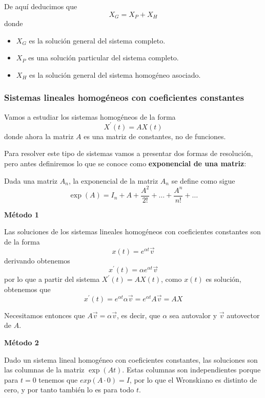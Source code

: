 De aquí deducimos que $$X_G = X_P+X_H$$
donde 
\begin{itemize}
\item $X_G$ es la solución general del sistema completo.

\item $X_P$ es una solución particular del sistema completo.

\item $X_H$ es la solución general del sistema homogéneo asociado.
\end{itemize}

\subsubsection{Sistemas lineales homogéneos con coeficientes constantes}
Vamos a estudiar los sistemas homogéneos de la forma $$X^\prime(t) = AX(t)$$
donde ahora la matriz $A$ es una matriz de constantes, no de funciones.

Para resolver este tipo de sistemas vamos a presentar dos formas de resolución, pero antes definiremos lo que se conoce como \textbf{exponencial de una matriz}:

\begin{definition}

Dada una matriz $A_n$, la exponencial de la matriz $A_n$ se define como sigue
$$\exp(A) = I_n + A + \frac{A^2}{2!} + \hdots + \frac{A^n}{n!} + \hdots$$

\end{definition}

\vspace{5mm}
\noindent\textbf{Método 1}

Las soluciones de los sistemas lineales homogéneos con coeficientes constantes son de la forma $$x(t) = e^{\alpha t}\vec{v}$$
derivando obtenemos $$x^\prime(t) = \alpha e^{\alpha t}\vec{v}$$ por lo que a partir del sistema $X^\prime(t) = AX(t)$, como $x(t)$ es solución, obtenemos que $$x^\prime(t) = e^{\alpha t}\alpha\vec{v} = e^{\alpha t}A\vec{v} = AX$$

Necesitamos entonces que $A\vec{v} = \alpha\vec{v}$, es decir, que $\alpha$ sea autovalor y $\vec{v}$ autovector de $A$.

\vspace{5mm}
\noindent\textbf{Método 2}

Dado un sistema lineal homogéneo con coeficientes constantes, las soluciones son las columnas de la matriz $\exp(At)$. Estas columnas son independientes porque para $t=0$ tenemos que $exp(A\cdot0) = I$, por lo que el Wronskiano es distinto de cero, y por tanto también lo es para todo $t$.

